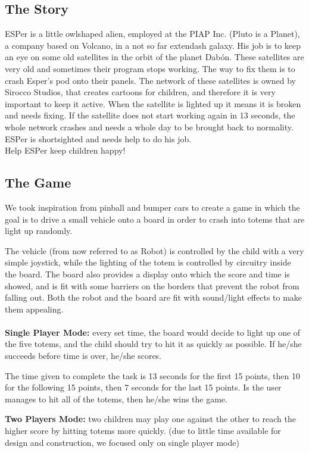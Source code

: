 \documentclass[a4paper,twoside]{book}
\begin{document}
\subsection{The Story}

ESPer is a little owl\textendash shaped alien, employed at the PIAP Inc. (Pluto is a Planet), a company based on Volcano, in a not so far	extendash galaxy. His job is to keep an eye on some old satellites in the orbit of the planet Dab\'{o}n. These satellites are very old and sometimes their program stops working. The way to fix them is to crash Esper's pod onto their panels. The network of these satellites is owned by Sirocco Studios, that creates cartoons for children, and therefore it is very important to keep it active. When the satellite is lighted up it means it is broken and needs fixing. If the satellite does not start working again in 13 seconds, the whole network crashes and needs a whole day to be brought back to normality. ESPer is short\textendash sighted and needs help to do his job.
\\
Help ESPer keep children happy!

\subsection{The Game}
We took inspiration from pinball and bumper cars to create a game in which the goal is to drive a small vehicle onto a board in order to crash into totems that are light up randomly.

The vehicle (from now referred to as Robot) is controlled by the child with a very simple joystick, while the lighting of the totem is controlled by circuitry inside the board. The board also provides a display onto which the score and time is showed, and is fit with some barriers on the borders that prevent the robot from falling out. Both the robot and the board are fit with sound/light effects to make them appealing.
\\
\\
\textbf{Single Player Mode:} every set time, the board would decide to light up one of the five totems, and the child should try to hit it as quickly as possible. If he/she succeeds before time is over, he/she scores.

The time given to complete the task is 13 seconds for the first 15 points, then 10 for the following 15 points, then 7 seconds for the last 15 points. Is the user manages to hit all of the totems, then he/she wins the game.


\textbf{Two Players Mode:} two children may play one against the other to reach the higher score by hitting totems more quickly.
(due to little time available for  design and construction, we focused only on single player mode)
\end{document}
